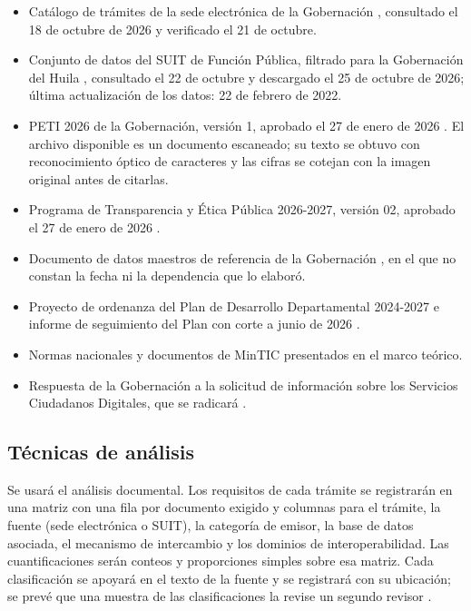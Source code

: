 \begin{itemize}
\item Catálogo de trámites de la sede electrónica de la Gobernación \parencite{gobernaciondelhuila2026tramites}, consultado el 18 de octubre de 2026 y verificado el 21 de octubre.
\item Conjunto de datos del SUIT de Función Pública, filtrado para la Gobernación del Huila \parencite{funcionpublica2022suit}, consultado el 22 de octubre y descargado el 25 de octubre de 2026; última actualización de los datos: 22 de febrero de 2022.
\item PETI 2026 de la Gobernación, versión 1, aprobado el 27 de enero de 2026 \parencite{gobernaciondelhuila2026peti}. El archivo disponible es un documento escaneado; su texto se obtuvo con reconocimiento óptico de caracteres y las cifras se cotejan con la imagen original antes de citarlas.
\item Programa de Transparencia y Ética Pública 2026-2027, versión 02, aprobado el 27 de enero de 2026 \parencite{gobernaciondelhuila2026ptep}.
\item Documento de datos maestros de referencia de la Gobernación \parencite{gobernaciondelhuila2026datosmaestros}, en el que no constan la fecha ni la dependencia que lo elaboró.
\item Proyecto de ordenanza del Plan de Desarrollo Departamental 2024-2027 \parencite{gobernaciondelhuila2024ordenanza} e informe de seguimiento del Plan con corte a junio de 2026 \parencite{gobernaciondelhuila2026seguimiento}.
\item Normas nacionales y documentos de MinTIC presentados en el marco teórico.
\item Respuesta de la Gobernación a la solicitud de información sobre los Servicios Ciudadanos Digitales, que se radicará .
\end{itemize}

\subsection{Técnicas de análisis}

Se usará el análisis documental. Los requisitos de cada trámite se registrarán en una matriz con una fila por documento exigido y columnas para el trámite, la fuente (sede electrónica o SUIT), la categoría de emisor, la base de datos asociada, el mecanismo de intercambio y los dominios de interoperabilidad. Las cuantificaciones serán conteos y proporciones simples sobre esa matriz. Cada clasificación se apoyará en el texto de la fuente y se registrará con su ubicación; se prevé que una muestra de las clasificaciones la revise un segundo revisor .

